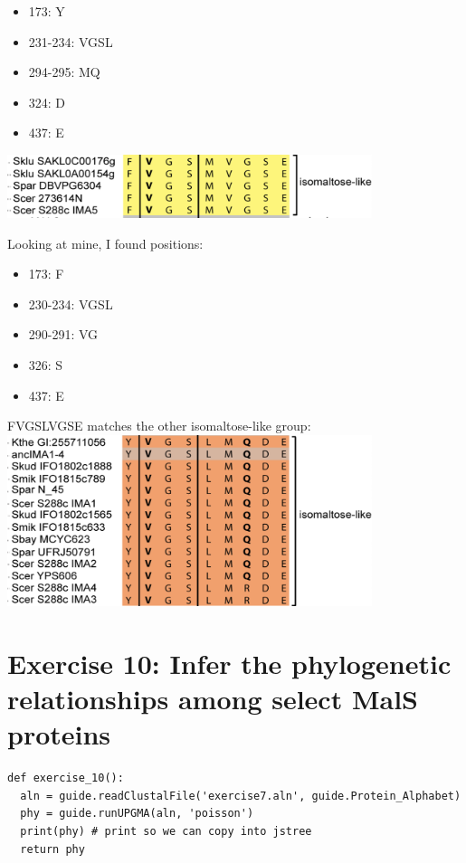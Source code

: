 \documentclass{article} %
\begin{document}
\begin{itemize}
    \item 173: Y
    \item 231-234: VGSL
    \item 294-295: MQ
    \item 324: D
    \item 437: E
\end{itemize}

\includegraphics[width=0.8\textwidth]{ima1.png}

\par Looking at mine, I found positions: \\

\begin{itemize}
    \item 173: F
    \item 230-234: VGSL
    \item 290-291: VG
    \item 326: S
    \item 437: E
\end{itemize}

FVGSLVGSE matches the other isomaltose-like group: \\

\includegraphics[width=0.8\textwidth]{mine.png}

\section{Exercise 10: Infer the phylogenetic relationships among select MalS proteins}

\begin{verbatim}
def exercise_10():
  aln = guide.readClustalFile('exercise7.aln', guide.Protein_Alphabet)
  phy = guide.runUPGMA(aln, 'poisson')
  print(phy) # print so we can copy into jstree 
  return phy
\end{verbatim}
\end{document}
